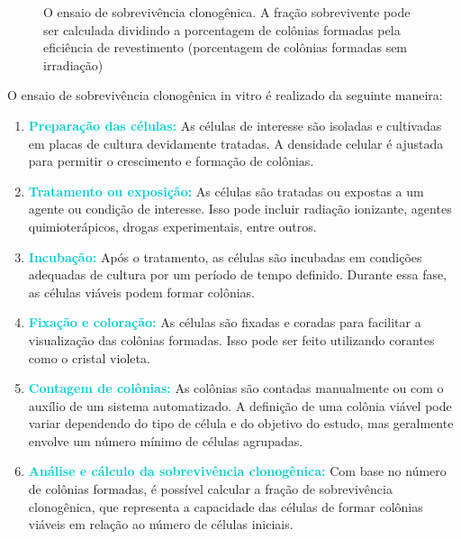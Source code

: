 \documentclass[11pt,a4paper]{article}
\begin{document}
	\begin{figure}[h]
		\centering
		\caption{O ensaio de sobrevivência clonogênica. A fração sobrevivente pode ser calculada dividindo a porcentagem de colônias formadas pela eficiência de revestimento (porcentagem de colônias formadas sem irradiação)}
		\label{fig:fracaoDeSobrevivencia}
	\end{figure}

	O ensaio de sobrevivência clonogênica in vitro é realizado da seguinte maneira:

	\begin{enumerate}[label=\textcolor{CarnationPink}{\arabic*${}^\circ $}]
		\item \textcolor{DarkTurquoise}{\textbf{Preparação das células:}} As células de interesse são isoladas e cultivadas em placas de cultura devidamente tratadas. A densidade celular é ajustada para permitir o crescimento e formação de colônias.
		\item \textcolor{DarkTurquoise}{\textbf{Tratamento ou exposição:}} As células são tratadas ou expostas a um agente ou condição de interesse. Isso pode incluir radiação ionizante, agentes quimioterápicos, drogas experimentais, entre outros.
		\item \textcolor{DarkTurquoise}{\textbf{Incubação:}} Após o tratamento, as células são incubadas em condições adequadas de cultura por um período de tempo definido. Durante essa fase, as células viáveis podem formar colônias.
		\item \textcolor{DarkTurquoise}{\textbf{Fixação e coloração:}} As células são fixadas e coradas para facilitar a visualização das colônias formadas. Isso pode ser feito utilizando corantes como o cristal violeta.
		\item \textcolor{DarkTurquoise}{\textbf{Contagem de colônias:}} As colônias são contadas manualmente ou com o auxílio de um sistema automatizado. A definição de uma colônia viável pode variar dependendo do tipo de célula e do objetivo do estudo, mas geralmente envolve um número mínimo de células agrupadas.
		\item \textcolor{DarkTurquoise}{\textbf{Análise e cálculo da sobrevivência clonogênica:}} Com base no número de colônias formadas, é possível calcular a fração de sobrevivência clonogênica, que representa a capacidade das células de formar colônias viáveis em relação ao número de células iniciais.
	\end{enumerate}
\end{document}
